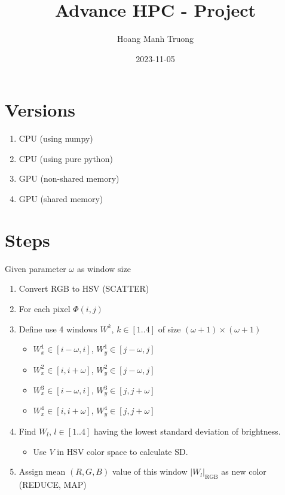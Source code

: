 \documentclass[
  10pt,
  a4paper,
  a4paper]{article}
\title{Advance HPC - Project}
\author{Hoang Manh Truong}
\date{2023-11-05}
\providecommand{\tightlist}{%
  \setlength{\itemsep}{0pt}\setlength{\parskip}{0pt}}\usepackage{longtable,booktabs,array}
\begin{document}
\maketitle
\ifdefined\Shaded\renewenvironment{Shaded}{\begin{tcolorbox}[breakable, boxrule=0pt, enhanced, sharp corners, colback={codebgcolor}, borderline west={3pt}{0pt}{shadecolor}, frame hidden]}{\end{tcolorbox}}\fi

\hypertarget{versions}{%
\section{Versions}\label{versions}}

\begin{enumerate}
\def\labelenumi{\arabic{enumi}.}
\tightlist
\item
  CPU (using numpy)
\item
  CPU (using pure python)
\item
  GPU (non-shared memory)
\item
  GPU (shared memory)
\end{enumerate}

\hypertarget{steps}{%
\section{Steps}\label{steps}}

Given parameter \(\omega\) as window size

\begin{enumerate}
\def\labelenumi{\arabic{enumi}.}
\tightlist
\item
  Convert RGB to HSV (SCATTER)
\item
  For each pixel \(\Phi(i, j)\)
\item
  Define use 4 windows \(W^k\), \(k \in [1..4]\) of size
  \((\omega + 1) \times (\omega + 1)\)

  \begin{itemize}
  \tightlist
  \item
    \(W^1_x \in [i - \omega, i]\), \(W^1_y \in [j - \omega, j]\)
  \item
    \(W^2_x \in [i, i + \omega]\), \(W^2_y \in [j - \omega, j]\)
  \item
    \(W^3_x \in [i - \omega, i]\), \(W^3_y \in [j, j + \omega]\)
  \item
    \(W^4_x \in [i, i + \omega]\), \(W^4_y \in [j, j + \omega]\)
  \end{itemize}
\item
  Find \(W_l\), \(l \in [1..4]\) having the lowest standard deviation of
  brightness.

  \begin{itemize}
  \tightlist
  \item
    Use \(V\) in HSV color space to calculate SD.
  \end{itemize}
\item
  Assign mean \((R, G, B)\) value of this window
  \(\left| W_l \right|_{\text{RGB}}\) as new color (REDUCE, MAP)
\end{enumerate}
\end{document}
